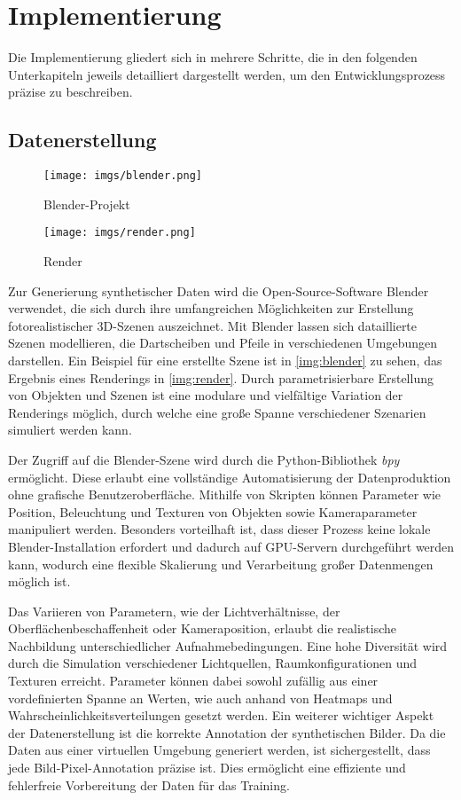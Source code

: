 \section{Implementierung}
\label{sec:implementierung}
Die Implementierung gliedert sich in mehrere Schritte, die in den folgenden Unterkapiteln jeweils detailliert dargestellt werden, um den Entwicklungsprozess präzise zu beschreiben.

\subsection{Datenerstellung}
\label{sec:implementierung:datenerstellung}

\begin{figure}
    \centering
    \texttt{[image: imgs/blender.png]}
    \caption{Blender-Projekt}
    \label{img:blender}
\end{figure}

\begin{figure}
    \centering
    \texttt{[image: imgs/render.png]}
    \caption{Render}
    \label{img:render}
\end{figure}

Zur Generierung synthetischer Daten wird die Open-Source-Software Blender verwendet, die sich durch ihre umfangreichen Möglichkeiten zur Erstellung fotorealistischer 3D-Szenen auszeichnet. Mit Blender lassen sich dataillierte Szenen modellieren, die Dartscheiben und Pfeile in verschiedenen Umgebungen darstellen. Ein Beispiel für eine erstellte Szene ist in \autoref{img:blender} zu sehen, das Ergebnis eines Renderings in \autoref{img:render}. Durch parametrisierbare Erstellung von Objekten und Szenen ist eine modulare und vielfältige Variation der Renderings möglich, durch welche eine große Spanne verschiedener Szenarien simuliert werden kann.

Der Zugriff auf die Blender-Szene wird durch die Python-Bibliothek \textit{bpy} ermöglicht. Diese erlaubt eine vollständige Automatisierung der Datenproduktion ohne grafische Benutzeroberfläche. Mithilfe von Skripten können Parameter wie Position, Beleuchtung und Texturen von Objekten sowie Kameraparameter manipuliert werden. Besonders vorteilhaft ist, dass dieser Prozess keine lokale Blender-Installation erfordert und dadurch auf GPU-Servern durchgeführt werden kann, wodurch eine flexible Skalierung und Verarbeitung großer Datenmengen möglich ist.

Das Variieren von Parametern, wie der Lichtverhältnisse, der Oberflächenbeschaffenheit oder Kameraposition, erlaubt die realistische Nachbildung unterschiedlicher Aufnahmebedingungen. Eine hohe Diversität wird durch die Simulation verschiedener Lichtquellen, Raumkonfigurationen und Texturen erreicht. Parameter können dabei sowohl zufällig aus einer vordefinierten Spanne an Werten, wie auch anhand von Heatmaps und Wahrscheinlichkeitsverteilungen gesetzt werden. Ein weiterer wichtiger Aspekt der Datenerstellung ist die korrekte Annotation der synthetischen Bilder. Da die Daten aus einer virtuellen Umgebung generiert werden, ist sichergestellt, dass jede Bild-Pixel-Annotation präzise ist. Dies ermöglicht eine effiziente und fehlerfreie Vorbereitung der Daten für das Training.

